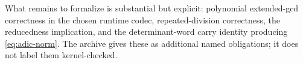 What remains to formalize is substantial but explicit: polynomial extended-gcd correctness in the chosen runtime codec, repeated-division correctness, the reducedness implication, and the determinant-word carry identity producing \eqref{eq:adic-norm}. The archive gives these as additional named obligations; it does not label them kernel-checked.
